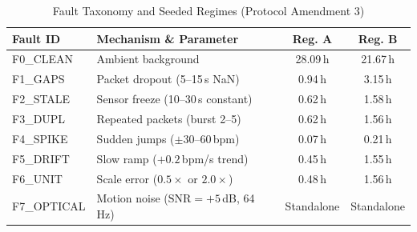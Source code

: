 \begin{table}[htbp]
\caption{Fault Taxonomy and Seeded Regimes (Protocol Amendment 3)}
\label{tab:fault_taxonomy}
\centering
\scriptsize
\begin{tabular}{|l|p{3.3cm}|c|c|}
\hline
\textbf{Fault ID} & \textbf{Mechanism \& Parameter} & \textbf{Reg. A} & \textbf{Reg. B} \\
\hline
F0\_CLEAN & Ambient background & 28.09\,h & 21.67\,h \\
\hline
F1\_GAPS & Packet dropout (5--15\,s NaN) & 0.94\,h & 3.15\,h \\
\hline
F2\_STALE & Sensor freeze (10--30\,s constant) & 0.62\,h & 1.58\,h \\
\hline
F3\_DUPL & Repeated packets (burst 2--5) & 0.62\,h & 1.56\,h \\
\hline
F4\_SPIKE & Sudden jumps ($\pm 30$--$60$\,bpm) & 0.07\,h & 0.21\,h \\
\hline
F5\_DRIFT & Slow ramp ($+0.2$\,bpm/s trend) & 0.45\,h & 1.55\,h \\
\hline
F6\_UNIT & Scale error ($0.5\times$ or $2.0\times$) & 0.48\,h & 1.56\,h \\
\hline
F7\_OPTICAL & Motion noise ($\text{SNR}=+5$\,dB, 64\,Hz) & Standalone & Standalone \\
\hline
\end{tabular}
\end{table}
